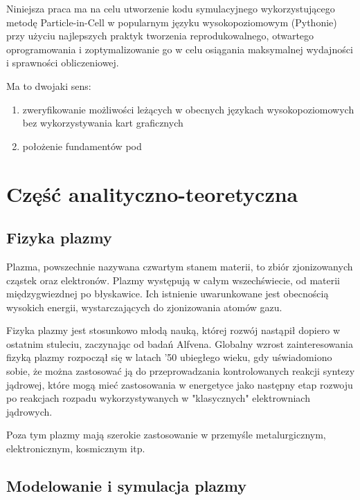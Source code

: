     Niniejsza praca ma na celu utworzenie kodu symulacyjnego wykorzystującego metodę Particle-in-Cell w popularnym języku
    wysokopoziomowym (Pythonie) przy użyciu najlepszych praktyk tworzenia reprodukowalnego, otwartego oprogramowania
    i zoptymalizowanie go w celu osiągania maksymalnej wydajności i sprawności obliczeniowej.

    Ma to dwojaki sens:
    \begin{enumerate}
        \item zweryfikowanie możliwości leżących w obecnych językach wysokopoziomowych bez wykorzystywania kart graficznych
        \item położenie fundamentów pod
    \end{enumerate}
    \section[Część analityczno-teoretyczna]{Część analityczno-teoretyczna} %

    \subsection{Fizyka plazmy}

    Plazma, powszechnie nazywana czwartym stanem materii, to zbiór zjonizowanych %
    cząstek oraz elektronów. Plazmy występują w całym wszechświecie, od materii międzygwiezdnej po błyskawice.
    Ich istnienie uwarunkowane jest obecnością wysokich energii, wystarczających do zjonizowania atomów gazu.

    Fizyka plazmy jest stosunkowo młodą nauką, której rozwój nastąpił dopiero w ostatnim stuleciu, zaczynając od badań Alfvena. %
    Globalny wzrost zainteresowania fizyką plazmy rozpoczął się w latach '50 ubiegłego wieku, %
    gdy uświadomiono sobie, że można zastosować ją do przeprowadzania kontrolowanych reakcji syntezy jądrowej, %
    które mogą mieć zastosowania w energetyce jako następny etap rozwoju po reakcjach rozpadu wykorzystywanych
    w "klasycznych" elektrowniach jądrowych.

    Poza tym plazmy mają szerokie zastosowanie w przemyśle metalurgicznym, elektronicznym, kosmicznym itp. %

    \subsection{Modelowanie i symulacja plazmy}

